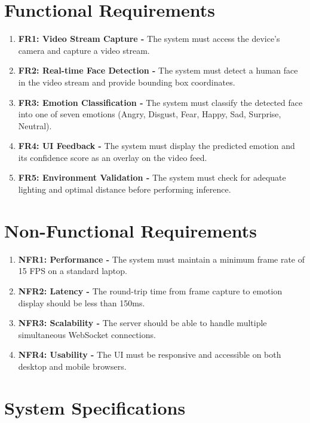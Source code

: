 \documentclass[12pt,a4paper]{report}
\begin{document}
\section{Functional Requirements}
\begin{enumerate}
    \item \textbf{FR1: Video Stream Capture -} The system must access the device's camera and capture a video stream.
    \item \textbf{FR2: Real-time Face Detection -} The system must detect a human face in the video stream and provide bounding box coordinates.
    \item \textbf{FR3: Emotion Classification -} The system must classify the detected face into one of seven emotions (Angry, Disgust, Fear, Happy, Sad, Surprise, Neutral).
    \item \textbf{FR4: UI Feedback -} The system must display the predicted emotion and its confidence score as an overlay on the video feed.
    \item \textbf{FR5: Environment Validation -} The system must check for adequate lighting and optimal distance before performing inference.
\end{enumerate}

\section{Non-Functional Requirements}
\begin{enumerate}
    \item \textbf{NFR1: Performance -} The system must maintain a minimum frame rate of 15 FPS on a standard laptop.
    \item \textbf{NFR2: Latency -} The round-trip time from frame capture to emotion display should be less than 150ms.
    \item \textbf{NFR3: Scalability -} The server should be able to handle multiple simultaneous WebSocket connections.
    \item \textbf{NFR4: Usability -} The UI must be responsive and accessible on both desktop and mobile browsers.
\end{enumerate}

\section{System Specifications}
\end{document}
